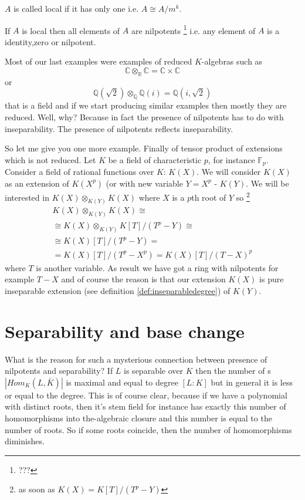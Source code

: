 \begin{definition}[local]
   $A$ is called local if it has only one
   i.e. $A \cong A/m^k$. 
  \label{def:local}
\end{definition}

If $A$ is local then all elements of $A$ are nilpotents
\footnote{
  ???
} i.e. any element of $A$ is a identity,zero or nilpotent.

Most of our last examples were examples of reduced $K$-algebras such
as
\[
\mathbb{C} \otimes_{\mathbb{R}} \mathbb{C} =
\mathbb{C} \times \mathbb{C}
\]
or
\[
\mathbb{Q}\left(\sqrt{2}\right) \otimes_{\mathbb{Q}}
\mathbb{Q}\left(i\right) =
\mathbb{Q}\left(i, \sqrt{2}\right)
\]
that is a field and if we start producing similar examples then mostly
they are reduced. Well, why? Because in fact the presence of
nilpotents has to do with inseparability. The presence of nilpotents
reflects inseparability.

So let me give you one more example. Finally of tensor product of
extensions which is not reduced. Let $K$ be a field of characteristic
$p$, for instance $\mathbb{F}_p$. Consider a field of rational
functions over $K$: $K\left(X\right)$. We will consider
$K\left(X\right)$ as an extension of $K\left(X^p\right)$ (or with new
variable $Y = X^p$ - $K\left(Y\right)$. We will be interested in
\(
K\left(X\right)
\otimes_{K\left(Y\right)}
K\left(X\right)
\) where $X$ is a $p$th root of $Y$ so
\footnote{
  as soon as
  $K\left(X\right) = K\left[T\right]/\left(T^p - Y\right)$
}
\begin{eqnarray}
K\left(X\right)
\otimes_{K\left(Y\right)}
K\left(X\right)
\cong
\nonumber \\
\cong
K\left(X\right)
\otimes_{K\left(Y\right)}
K\left[T\right]/\left(T^p - Y\right)
\cong
\nonumber \\
\cong
K\left(X\right)\left[T\right]/\left(T^p - Y\right) =
\nonumber \\
=
K\left(X\right)\left[T\right]/\left(T^p - X^p\right) =
K\left(X\right)\left[T\right]/\left(T - X\right)^p
\nonumber
\end{eqnarray}
where $T$ is another variable. As result we have got a ring with
nilpotents for example $T - X$ and of course the reason is that our
extension $K\left(X\right)$ is pure inseparable extension (see
definition \ref{def:inseparabledegree}) of $K\left(Y\right)$.  

\section{Separability and base change}
What is the reason for such a mysterious connection between 
presence of nilpotents and separability? If $L$ is separable over $K$
then the number of s
$\left|Hom_K\left(L, \bar{K}\right)\right|$ is maximal and equal to
degree $\left[L : K\right]$ but in general it is less or equal to the
degree.  This is of course clear, because  if we have a polynomial
with distinct roots, then it's stem field for instance  has exactly
this number of  homomorphisms into the-algebraic closure and this
number is equal to the number of roots. So if some roots coincide,  
then the number of homomorphisms diminishes. 

